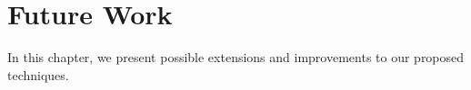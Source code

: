 \chapter{Future Work}
\label{chap:futurework}

In this chapter, we present possible extensions and improvements to our proposed techniques.

\lipsum

